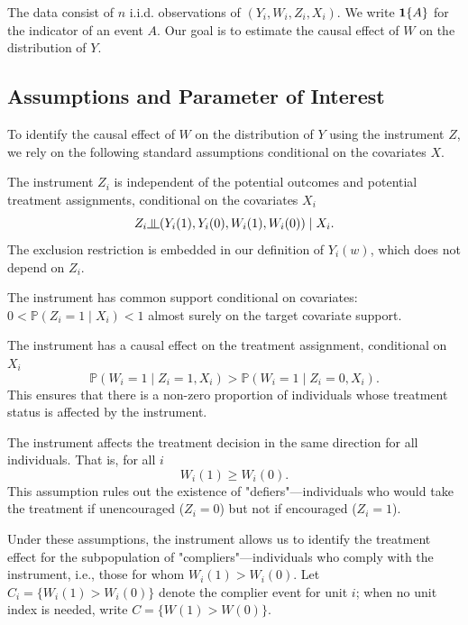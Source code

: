\documentclass[final,3p,fleqn, 10pt]{elsarticle}
\begin{document}
The data consist of $n$ i.i.d. observations of $(Y_i, W_i, Z_i, X_i)$. We write $\mathbf{1}\{A\}$ for the indicator of an event $A$. Our goal is to estimate the causal effect of $W$ on the distribution of $Y$.

\subsection{Assumptions and Parameter of Interest}

To identify the causal effect of $W$ on the distribution of $Y$ using the instrument $Z$, we rely on the following standard assumptions conditional on the covariates $X$.

\begin{assumption} \label{ass:independence}
The instrument $Z_i$ is independent of the potential outcomes and potential treatment assignments, conditional on the covariates $X_i$
$$ Z_i \indep (Y_i(1), Y_i(0), W_i(1), W_i(0)) \mid X_i. $$
The exclusion restriction is embedded in our definition of $Y_i(w)$, which does not depend on $Z_i$.
\end{assumption}

\begin{assumption} \label{ass:instrument_overlap}
The instrument has common support conditional on covariates: $0 < \mathbb{P}(Z_i=1 \mid X_i) < 1$ almost surely on the target covariate support.
\end{assumption}

\begin{assumption}[Relevance] \label{ass:relevance}
The instrument has a causal effect on the treatment assignment, conditional on $X_i$
$$ \mathbb{P}(W_i=1 \mid Z_i=1, X_i) > \mathbb{P}(W_i=1 \mid Z_i=0, X_i). $$
This ensures that there is a non-zero proportion of individuals whose treatment status is affected by the instrument.
\end{assumption}

\begin{assumption}[Monotonicity] \label{ass:monotonicity}
The instrument affects the treatment decision in the same direction for all individuals. That is, for all $i$
$$ W_i(1) \ge W_i(0). $$
This assumption rules out the existence of "defiers"—individuals who would take the treatment if unencouraged ($Z_i=0$) but not if encouraged ($Z_i=1$).
\end{assumption}

Under these assumptions, the instrument allows us to identify the treatment effect for the subpopulation of "compliers"—individuals who comply with the instrument, i.e., those for whom $W_i(1) > W_i(0)$. Let $C_i=\{W_i(1)>W_i(0)\}$ denote the complier event for unit $i$; when no unit index is needed, write $C=\{W(1)>W(0)\}$.
\end{document}
